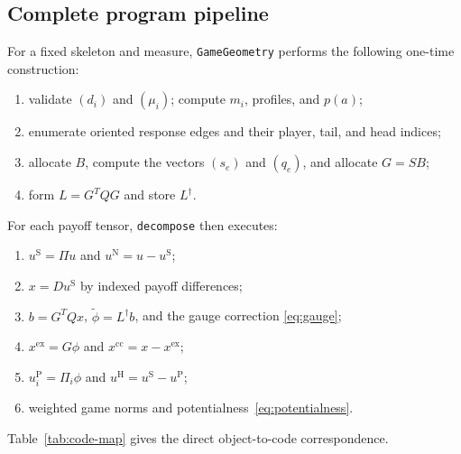 \documentclass[11pt]{article}
\begin{document}
\subsection{Complete program pipeline}

For a fixed skeleton and measure, \texttt{GameGeometry} performs the following
one-time construction:
\begin{enumerate}
 \item validate $(d_i)$ and $(\mu_i)$; compute $m_i$, profiles, and $p(a)$;
 \item enumerate oriented response edges and their player, tail, and head
       indices;
 \item allocate $B$, compute the vectors $(s_e)$ and $(q_e)$, and allocate
       $G=SB$;
 \item form $L=G^TQG$ and store $L^\dagger$.
\end{enumerate}
For each payoff tensor, \texttt{decompose} then executes:
\begin{enumerate}
 \item $u^{\mathrm S}=\Pi u$ and $u^{\mathrm N}=u-u^{\mathrm S}$;
 \item $x=Du^{\mathrm S}$ by indexed payoff differences;
 \item $b=G^TQx$, $\widetilde\phi=L^\dagger b$, and the gauge correction
       \eqref{eq:gauge};
 \item $x^{\mathrm{ex}}=G\phi$ and $x^{\mathrm{cc}}=x-x^{\mathrm{ex}}$;
 \item $u_i^{\mathrm P}=\Pi_i\phi$ and
       $u^{\mathrm H}=u^{\mathrm S}-u^{\mathrm P}$;
 \item weighted game norms and potentialness~\eqref{eq:potentialness}.
\end{enumerate}

Table~\ref{tab:code-map} gives the direct object-to-code correspondence.
\end{document}
